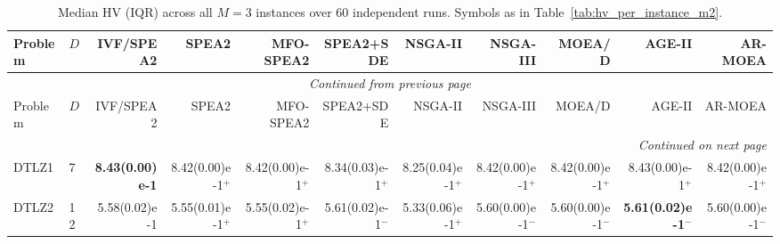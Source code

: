 \documentclass[pdflatex,sn-mathphys-ay]{sn-jnl}%
\theoremstyle{thmstyleone}%
\theoremstyle{thmstyletwo}%
\theoremstyle{thmstylethree}%
\begin{document}
\clearpage
\begin{landscape}
	{\tiny
		\setlength{\tabcolsep}{2pt}%
		\renewcommand{\arraystretch}{0.95}%
		\begin{longtable}{llrrrrrrrrr}
			\caption{Median HV (IQR) across all $M=3$ instances over 60 independent runs. Symbols as in Table~\ref{tab:hv_per_instance_m2}.}
			\label{tab:hv_per_instance_m3}                                                                                                                                                                                                                                                                               \\
			\toprule
			Problem                           & $D$ & IVF/SPEA2              & SPEA2                     & MFO-SPEA2                 & SPEA2+SDE                    & NSGA-II                   & NSGA-III                     & MOEA/D                    & AGE-II                       & AR-MOEA                      \\
			\midrule
			\endfirsthead
			\multicolumn{11}{c}{{\textit{Continued from previous page}}}                                                                                                                                                                                                                                                 \\
			\toprule
			Problem                           & $D$ & IVF/SPEA2              & SPEA2                     & MFO-SPEA2                 & SPEA2+SDE                    & NSGA-II                   & NSGA-III                     & MOEA/D                    & AGE-II                       & AR-MOEA                      \\
			\midrule
			\endhead
			\midrule
			\multicolumn{11}{r}{{\textit{Continued on next page}}}                                                                                                                                                                                                                                                       \\
			\endfoot
			\botrule
			\endlastfoot
			DTLZ1                             & 7   & \textbf{8.43(0.00)e-1} & 8.42(0.00)e-1$^{+}$       & 8.42(0.00)e-1$^{+}$       & 8.34(0.03)e-1$^{+}$          & 8.25(0.04)e-1$^{+}$       & 8.42(0.00)e-1$^{+}$          & 8.42(0.00)e-1$^{+}$       & 8.43(0.00)e-1$^{+}$          & 8.42(0.00)e-1$^{+}$          \\
			DTLZ2                             & 12  & 5.58(0.02)e-1          & 5.55(0.01)e-1$^{+}$       & 5.55(0.02)e-1$^{+}$       & 5.61(0.02)e-1$^{-}$          & 5.33(0.06)e-1$^{+}$       & 5.60(0.00)e-1$^{-}$          & 5.60(0.00)e-1$^{-}$       & \textbf{5.61(0.02)e-1}$^{-}$ & 5.60(0.00)e-1$^{-}$          \\

\end{longtable}}
\end{landscape}
\end{document}
